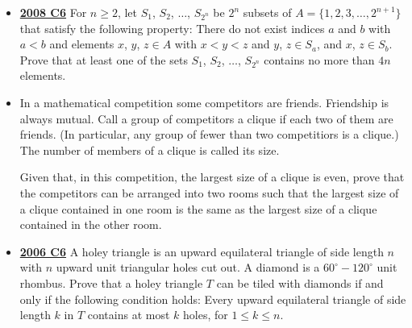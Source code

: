 \documentclass[11pt]{scrartcl}
\begin{document}
\begin{itemize}[leftmargin=*]
    \item \href{https://artofproblemsolving.com/community/c6h287863p1555914}{\textbf{2008 C6}} For $ n\geqslant 2$, let $ S_1$, $ S_2$, $ \dots$, $ S_{2^n}$ be $ 2^n$ subsets of $ A = \{1, 2, 3, \dots, 2^{n + 1}\}$ that satisfy the following property: There do not exist indices $ a$ and $ b$ with $ a < b$ and elements $ x$, $ y$, $ z\in A$ with $ x < y < z$ and $ y$, $ z\in S_a$, and $ x$, $ z\in S_b$. Prove that at least one of the sets $ S_1$, $ S_2$, $ \dots$, $ S_{2^n}$ contains no more than $ 4n$ elements.
    \item {} In a mathematical competition some competitors are friends. Friendship is always mutual. Call a group of competitors a clique if each two of them are friends. (In particular, any group of fewer than two competitiors is a clique.) The number of members of a clique is called its size.

Given that, in this competition, the largest size of a clique is even, prove that the competitors can be arranged into two rooms such that the largest size of a clique contained in one room is the same as the largest size of a clique contained in the other room.
    \item \href{https://artofproblemsolving.com/community/c6h155700p875004}{\textbf{2006 C6}} A holey triangle is an upward equilateral triangle of side length $n$ with $n$ upward unit triangular holes cut out. A diamond is a $60^\circ-120^\circ$ unit rhombus.
Prove that a holey triangle $T$ can be tiled with diamonds if and only if the following condition holds: Every upward equilateral triangle of side length $k$ in $T$ contains at most $k$ holes, for $1\leqslant k\leqslant n$.
\end{itemize}
\newpage
\end{document}
